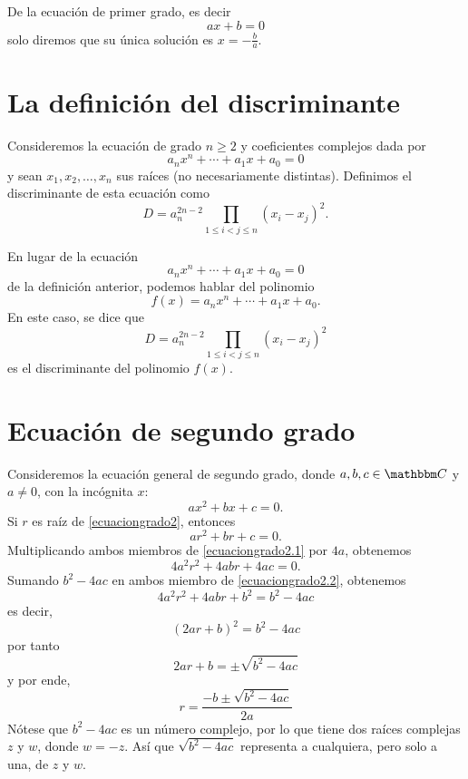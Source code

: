 \begin{observation}
    De la ecuación de primer grado, es decir
    $$ax+b=0$$
    solo diremos que su única solución es $\displaystyle x=-\frac{b}{a}$.
\end{observation}

\section{La definición del discriminante}

\begin{definition}\label{definicion:B.1.1}
    Consideremos la ecuación de grado $n \geq 2$ y coeficientes complejos dada por
    $$a_nx^n+\cdots +a_1x+a_0=0$$
    y sean $x_1, x_2, \dots, x_n$ sus raíces (no necesariamente distintas). Definimos el discriminante de esta ecuación como
    $$D=a_n^{2n-2}\prod_{1 \leq i < j \leq n}(x_i-x_j)^2.$$
\end{definition}

\begin{observation}
    En lugar de la ecuación
    $$a_nx^n+\cdots +a_1x+a_0=0$$
    de la definición anterior, podemos hablar del polinomio
    $$f(x)=a_nx^n+\cdots +a_1x+a_0.$$
    En este caso, se dice que
    $$D=a_n^{2n-2}\prod _{1 \leq i < j \leq n}(x_i-x_j)^2$$
    es el discriminante del polinomio $f(x)$.
\end{observation}

\section{Ecuación de segundo grado}

Consideremos la ecuación general de segundo grado, donde $a, b, c \in \CC$ y $a \neq 0$, con la incógnita $x$:
\begin{equation}
    ax^2+bx+c=0. \label{ecuaciongrado2}
\end{equation}
Si $r$ es raíz de \eqref{ecuaciongrado2}, entonces
\begin{equation}
    ar^2+br+c=0. \label{ecuaciongrado2.1}
\end{equation}
Multiplicando ambos miembros de \eqref{ecuaciongrado2.1} por $4a$, obtenemos
\begin{equation*}
    4a^2r^2+4abr+4ac=0. \label{ecuaciongrado2.2}
\end{equation*}
Sumando $b^2-4ac$ en ambos miembro de \eqref{ecuaciongrado2.2}, obtenemos
$$4a^2r^2+4abr+b^2=b^2-4ac $$
es decir,
$$(2ar+b)^2 = b^2-4ac$$
por tanto
$$2ar+b = \pm \sqrt{b^2-4ac}$$
y por ende,
$$r = \frac{-b \pm \sqrt{b^2-4ac}}{2a}$$\newpage
Nótese que $b^2-4ac$ es un número complejo, por lo que tiene dos raíces complejas $z$ y $w$, donde $w=-z$. Así que $\sqrt{b^2-4ac}$ representa a cualquiera, pero solo a una, de $z$ y $w$.

